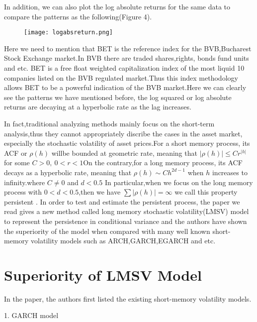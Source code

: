 \documentclass[10pt,a4paper]{article}
\begin{document}
In addition, we can also plot the log absolute returns for the same data to compare the patterns as the following(Figure 4).

\begin{figure}[!htb]
\centering
\texttt{[image: logabsreturn.png]}
\caption{}
\end{figure}

Here we need to mention that BET is the reference index for the BVB,Bucharest Stock Exchange market.In BVB  there are traded shares,rights, bonds fund units and etc. BET is a free float weighted capitalization index of the most liquid 10 companies listed on the BVB regulated market.Thus this index methodology allows BET to be a powerful indication of the BVB market.Here we can clearly see the patterns we have mentioned before, the log squared or log absolute returns are decaying at a hyperbolic rate as the lag increases.

 In fact,traditional analyzing methods mainly focus on the short-term analysis,thus they cannot appropriately discribe the cases in the asset market, especially  the stochastic volatility  of asset prices.For a short memory process, its ACF or $\rho(h)$ willbe bounded at geometric rate, meaning that $|\rho(h)|\leq C r^{|h|}$ for some $C>0,\  0<r<1 $On the contrary,for a long memory process, its ACF decays as a hyperbolic rate, meaning that $\rho(h)\sim Ch^{2d-1}$ when $h$ increases to infinity.where $C\neq 0$ and $d<0.5$ In particular,when we focus on the long memory process with $0<d<0.5$,then we have $\sum |\rho(h)|=\infty$ we call this property persistent .
In order to test and estimate the persistent process, the paper we read gives a new method called long memory stochastic volatility(LMSV) model to represent the persistence in conditional variance and the authors have shown the superiority of the model when compared with many well known short-memory volatility models such as ARCH,GARCH,EGARCH and etc.




 
\section{Superiority of LMSV Model}

In the paper, the authors first listed the existing short-memory volatility models.

\vspace{0.5cm}

1. GARCH model 
\end{document}
